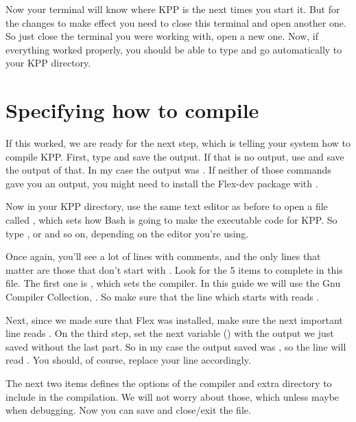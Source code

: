 \documentclass[letterpaper,10pt,openany,oneside]{sphinxmanual}
\begin{document}
Now your terminal will know where KPP is the next times you start it. But for
the changes to make effect you need to close this terminal and open another
one. So just close the terminal you were working with, open a new one. Now, if
everything worked properly, you should be able to type  and go
automatically to your KPP directory.


\section{Specifying how to compile}
\label{compiling:specifying-how-to-compile}
If this worked, we are ready for the next step, which is telling your system
how to compile KPP. First, type  and save the output. If that
is no output, use  and save the output of that. In my case
the output was . If neither of those
commands gave you an output, you might need to install the Flex-dev package
with .

Now in your KPP directory, use the same text editor as before to open a file
called , which sets how Bash is going to make the executable
code for KPP. So type , or  and so
on, depending on the editor you're using.

Once again, you'll see a lot of lines with comments, and the only lines that
matter are those that don't start with \sphinxcode{\#}. Look for the 5 items to complete
in this file. The first one is , which sets the compiler. In this guide
we will use the Gnu Compiler Collection, . So make sure that the line
which starts with  reads .

Next, since we made sure that Flex was installed, make sure the next important
line reads . On the third step, set the next variable
() with the output we just saved without the last part. So in
my case the output saved was , so the line
will read . You should, of course,
replace your line accordingly.

The next two items defines the options of the compiler and extra directory
to include in the compilation. We will not worry about those, which unless
maybe when debugging. Now you can save and close/exit the file.
\end{document}
